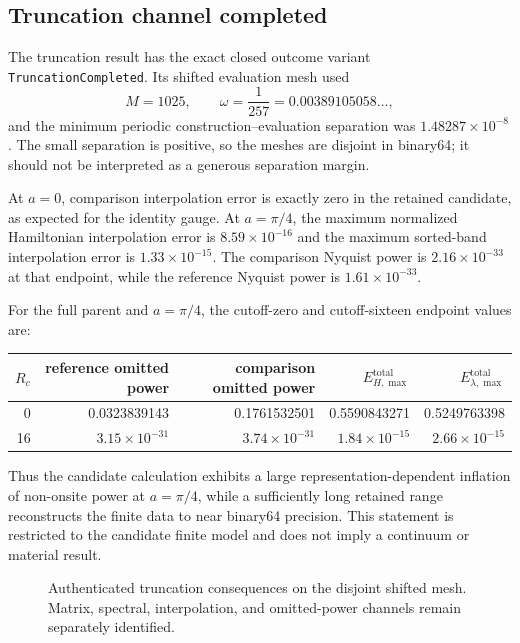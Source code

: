\subsection{Truncation channel completed}

The truncation result has the exact closed outcome variant
\texttt{TruncationCompleted}.  Its shifted evaluation
mesh used
\begin{equation}
 M=1025,
 \qquad \omega=\frac1{257}=0.00389105058\ldots,
\end{equation}
and the minimum periodic construction--evaluation separation was
$1.48287\times10^{-8}$.  The small separation is positive, so the meshes are disjoint in
binary64; it should not be interpreted as a generous separation margin.

At $a=0$, comparison interpolation error is exactly zero in the retained candidate, as
expected for the identity gauge.  At $a=\pi/4$, the maximum normalized Hamiltonian
interpolation error is $8.59\times10^{-16}$ and the maximum sorted-band interpolation
error is $1.33\times10^{-15}$.  The comparison Nyquist power is
$2.16\times10^{-33}$ at that endpoint, while the reference Nyquist power is
$1.61\times10^{-33}$.

For the full parent and $a=\pi/4$, the cutoff-zero and cutoff-sixteen endpoint values are:
\begin{center}
\small
\begin{tabular}{@{}rrrrr@{}}
\toprule
$R_c$ & reference omitted power & comparison omitted power &
$E_{H,\max}^{\mathrm{total}}$ & $E_{\lambda,\max}^{\mathrm{total}}$\\
\midrule
0  & 0.0323839143 & 0.1761532501 & 0.5590843271 & 0.5249763398\\
16 & $3.15\times10^{-31}$ & $3.74\times10^{-31}$ &
$1.84\times10^{-15}$ & $2.66\times10^{-15}$\\
\bottomrule
\end{tabular}
\end{center}
Thus the candidate calculation exhibits a large representation-dependent inflation of
non-onsite power at $a=\pi/4$, while a sufficiently long retained range reconstructs the
finite data to near binary64 precision.  This statement is restricted to the candidate
finite model and does not imply a continuum or material result.

\begin{figure}[htbp]
 \centering
 \caption{Authenticated truncation consequences on the disjoint shifted mesh.  Matrix,
 spectral, interpolation, and omitted-power channels remain separately identified.}
\end{figure}

